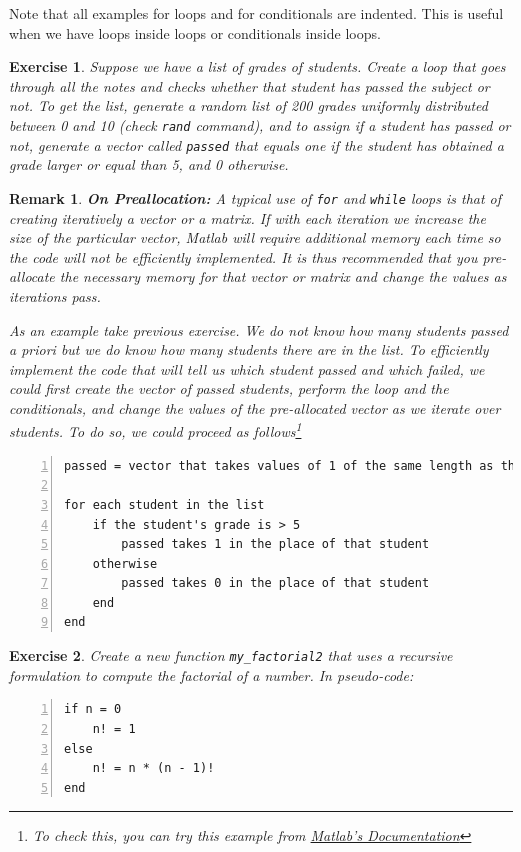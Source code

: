 \documentclass[a4paper,11pt]{article}
\newtheorem{exercise}{Exercise}
\newtheorem{remark}{Remark}
\begin{document}
Note that all examples for loops and for conditionals are indented. This is useful when we have loops inside loops or conditionals inside loops.

\begin{exercise}
Suppose we have a list of grades of students. Create a loop that goes through all the notes and checks whether that student has passed the subject or not. To get the list, generate a random list of 200 grades uniformly distributed between 0 and 10 (check \verb;rand; command), and to assign if a student has passed or not, generate a vector called \verb;passed; that equals one if the student has obtained a grade larger or equal than 5, and 0 otherwise.
\end{exercise}

\begin{remark} 

\textbf{On Preallocation:} A typical use of \verb;for; and \verb;while; loops is that of creating iteratively a vector or a matrix. If with each iteration we increase the size of the particular vector, Matlab will require additional memory each time so the code will not be efficiently implemented. It is thus recommended that you \textit{pre-allocate} the necessary memory for that vector or matrix and change the values as iterations pass. 

As an example take previous exercise. We do not know how many students passed \textit{a priori} but we do know how many students there are in the list. To efficiently implement the code that will tell us which student passed and which failed, we could first create the vector of passed students, perform the loop and the conditionals, and change the values of the pre-allocated vector as we iterate over students. To do so, we could proceed as follows\footnote{To check this, you can try this example from \href{https://es.mathworks.com/help/matlab/matlab_prog/preallocating-arrays.html}{{Matlab's Documentation}}}
\end{remark}

\begin{Verbatim}[numbers=left, fontsize = \small]
passed = vector that takes values of 1 of the same length as the students' list.

for each student in the list
	if the student's grade is > 5
		passed takes 1 in the place of that student
	otherwise
		passed takes 0 in the place of that student
	end
end		
\end{Verbatim}

\begin{exercise}
	Create a new function \verb+my_factorial2+ that uses a recursive formulation to compute the factorial of a number. In pseudo-code:
\end{exercise}
\begin{Verbatim}[numbers=left, fontsize=\small]
if n = 0
	n! = 1
else
	n! = n * (n - 1)!
end
\end{Verbatim}
\end{document}
